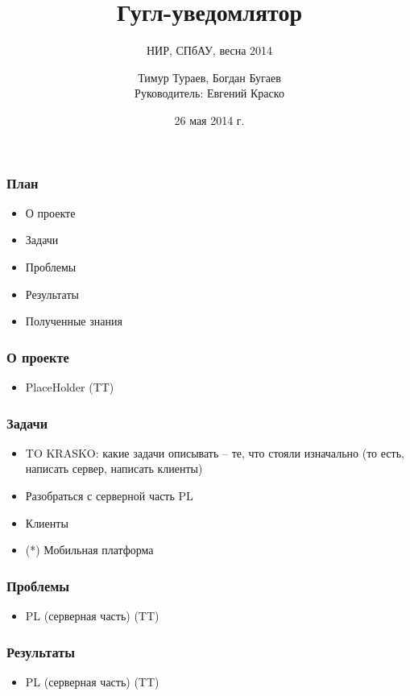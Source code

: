 \documentclass[10pt,pdf,hyperref={unicode}]{beamer}
\begin{document}
    \title[GoogleNotifier]{Гугл-уведомлятор}
    \subtitle{НИР, СПбАУ, весна 2014}
    \author{Тимур Тураев, Богдан Бугаев \\ Руководитель: Евгений Краско}
    \date{26 мая 2014 г.}

    \frame{\titlepage}

    \begin{frame}\frametitle{План}
        \begin{itemize}
        	\item О проекте
            \item Задачи
            \item Проблемы
            \item Результаты
            \item Полученные знания
        \end{itemize}
    \end{frame}
    
    \begin{frame}\frametitle{О проекте}
        \begin{itemize}
            \item	PlaceHolder (TT)
        \end{itemize}
    \end{frame}    

    \begin{frame}\frametitle{Задачи}
        \begin{itemize}%
            \item	TO KRASKO: какие задачи описывать -- те, что стояли изначально (то есть, написать сервер, написать клиенты)
            \item   Разобраться с серверной часть PL
            \item   Клиенты
            \item   (*) Мобильная платформа
        \end{itemize}
    \end{frame}
    
    \begin{frame}\frametitle{Проблемы}
        \begin{itemize}%
            \item   PL (серверная часть) (TT)
        \end{itemize}
    \end{frame}
    
    \begin{frame}\frametitle{Результаты}
        \begin{itemize}%
            \item	PL (серверная часть) (TT)
        \end{itemize}
    \end{frame}
    
\end{document}
